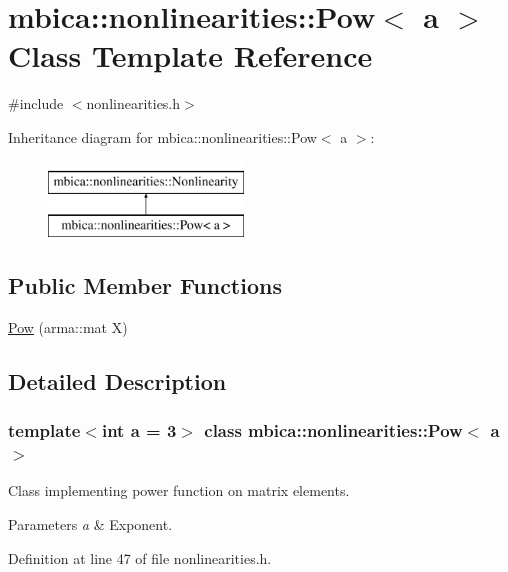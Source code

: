 \hypertarget{classmbica_1_1nonlinearities_1_1_pow}{
\section{mbica::nonlinearities::Pow$<$ a $>$ Class Template Reference}
\label{classmbica_1_1nonlinearities_1_1_pow}
}


{\ttfamily \#include $<$nonlinearities.h$>$}

Inheritance diagram for mbica::nonlinearities::Pow$<$ a $>$:\begin{figure}[H]
\begin{center}
\leavevmode
\includegraphics[height=2.000000cm]{classmbica_1_1nonlinearities_1_1_pow}
\end{center}
\end{figure}
\subsection*{Public Member Functions}
\begin{DoxyCompactItemize}
\item 
\hyperlink{classmbica_1_1nonlinearities_1_1_pow_a66f32832f6abd8f88c40351a94824cec}{Pow} (arma::mat X)
\end{DoxyCompactItemize}


\subsection{Detailed Description}
\subsubsection*{template$<$int a = 3$>$ class mbica::nonlinearities::Pow$<$ a $>$}

Class implementing power function on matrix elements.


\begin{DoxyParams}{Parameters}
{\em a} & Exponent. \\
\hline
\end{DoxyParams}


Definition at line 47 of file nonlinearities.h.



